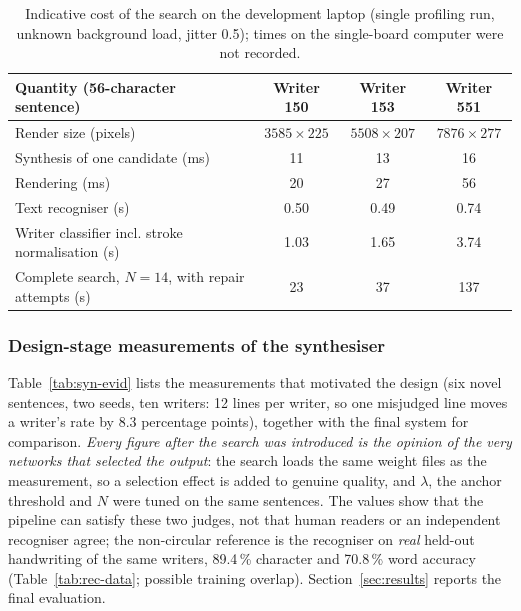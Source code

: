 \begin{table}[!htbp]
\centering
\fontsize{9.5}{11.5}\selectfont
\begin{tabularx}{\linewidth}{|X|c|c|c|}
\hline
\textbf{Quantity (56-character sentence)} & \textbf{Writer 150} & \textbf{Writer 153} & \textbf{Writer 551} \\
\hline
Render size (pixels) & $3585\times225$ & $5508\times207$ & $7876\times277$ \\
\hline
Synthesis of one candidate (ms) & 11 & 13 & 16 \\
\hline
Rendering (ms) & 20 & 27 & 56 \\
\hline
Text recogniser (s) & 0.50 & 0.49 & 0.74 \\
\hline
Writer classifier incl. stroke normalisation (s) & 1.03 & 1.65 & 3.74 \\
\hline
Complete search, $N=14$, with repair attempts (s) & 23 & 37 & 137 \\
\hline
\end{tabularx}
\caption{Indicative cost of the search on the development laptop (single profiling run, unknown background load, jitter 0.5); times on the single-board computer were not recorded.}
\label{tab:syn-cost}
\end{table}

\subsubsection{Design-stage measurements of the synthesiser}

Table~\ref{tab:syn-evid} lists the measurements that motivated the design (six novel sentences, two seeds, ten writers: 12 lines per writer, so one misjudged line moves a writer's rate by 8.3 percentage points), together with the final system for comparison.
\emph{Every figure after the search was introduced is the opinion of the very networks that selected the output}: the search loads the same weight files as the measurement, so a selection effect is added to genuine quality, and $\lambda$, the anchor threshold and $N$ were tuned on the same sentences.
The values show that the pipeline can satisfy these two judges, not that human readers or an independent recogniser agree; the non-circular reference is the recogniser on \emph{real} held-out handwriting of the same writers, 89.4\,\% character and 70.8\,\% word accuracy (Table~\ref{tab:rec-data}; possible training overlap).
Section~\ref{sec:results} reports the final evaluation.

